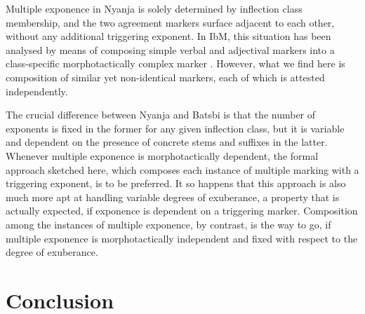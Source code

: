 \documentclass[output=paper]{langsci/langscibook}
\begin{document}
\begin{exe}
  \ex 
  \begin{xlist}
  \end{xlist}
\end{exe}

Multiple exponence in Nyanja is solely determined by inflection class
membership, and the two agreement markers surface adjacent to each
other, without any additional triggering exponent. In IbM, this
situation has been analysed by means of composing simple verbal and
adjectival markers into a class-specific morphotactically complex
marker \citep{Crysmann:14:OUP}. However, what we find here is
composition of similar yet non-identical markers, each of which is
attested independently. 

The crucial difference between Nyanja and Batsbi is that the number of
exponents is fixed in the former for any given inflection class, but
it is variable and dependent on the presence of concrete stems and
suffixes in the latter. Whenever multiple exponence is
morphotactically dependent, the formal approach sketched here, which
composes each instance of multiple marking with a triggering exponent,
is to be preferred. It so happens that this approach is also much
more apt at handling variable degrees of exuberance, a property
that is actually expected, if exponence is dependent on a triggering
marker. Composition among the instances of multiple exponence, by
contrast, is the way to go, if multiple exponence is morphotactically
independent and fixed with respect to the degree  of exuberance.     

\section{Conclusion}
\end{document}
